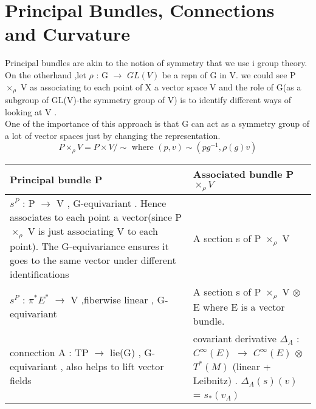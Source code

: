 \documentclass[psamsfonts]{amsart}
\theoremstyle{definition}
\theoremstyle{remark}
\newcommand{\vs}{\vspace{0.25mm}}
\numberwithin{equation}{section}
\begin{document}
\section{Principal Bundles, Connections and Curvature}
Principal bundles are akin to the notion of symmetry that we use i group theory. On the otherhand ,let $\rho$ : G $\to$ $GL(V)$ be a repn of G in V. we could see P $\times_{\rho}$ V as associating to each point of X a vector space V and the role of G(as a subgroup of GL(V)-the symmetry group of V) is to identify different ways of looking at V .\\
One of the importance of this approach is that G can act as a symmetry group of a lot of vector spaces just by changing the representation.
\[ P \times_{\rho} V = P \times V / \sim \text{ where } (p,v) \sim (pg^{-1},\rho(g)v) \] 
\newpage
\vspace{7mm} 
\begin{center}
	\begin{tabular}{ | p{9 cm} | p{9cm} |}
		\hline\hline
		\vspace{0.25mm}
		Principal bundle P  & \vspace{0.25mm} Associated bundle P $\times_{\rho}V$ \\ [1ex] \hline
		
		
		\vs $s^{P}$ : P $\to$ V , G-equivariant .\newline
		Hence associates to each point a vector(since P $\times_{\rho}$ V is just associating V to each point). The G-equivariance ensures it goes to the same vector under different identifications  & \vs A section s of P $\times_{\rho}$ V \\ [1ex] \hline
		
		
		\vs $s^{P}$ : $\pi^{*}E^{*}$ $\to$ V ,fiberwise linear , G-equivariant  & \vs A section s of P $\times_{\rho}$ V $\otimes$ E where E is a vector bundle. \\ [1ex]
		\hline
		
		\vs connection A : TP $\to$ lie(G) , G-equivariant , also helps to lift vector fields   & \vs covariant derivative $\Delta_{A}$ : $C^{\infty}(E)$ $\to$ $C^{\infty}(E)$ $\otimes$ $T^{*}(M)$ (linear + Leibnitz) .  \newline
		$\Delta_{A}(s)(v)$ =  $s_{*}(v_{A})$                          
		\\ [1ex]
		\hline
	\end{tabular}
\end{center}
\end{document}
